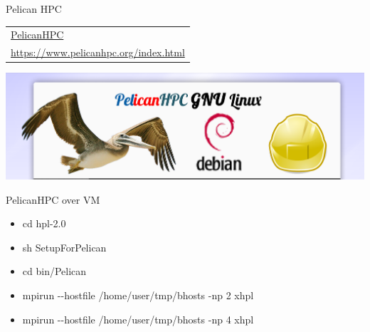 \documentclass[ignorenonframetext,]{beamer}
\providecommand{\tightlist}{%
  \setlength{\itemsep}{0pt}\setlength{\parskip}{0pt}}
\begin{document}
\begin{frame}{Pelican HPC}


\begin{longtable}[]{@{}l@{}}
\toprule
\endhead
\href{https://www.pelicanhpc.org/index.html}{PelicanHPC}\tabularnewline
\url{https://www.pelicanhpc.org/index.html}\tabularnewline
\bottomrule
\end{longtable}

\includegraphics{images/PelicanHPC.png}

\end{frame}

\begin{frame}{PelicanHPC over VM}

\begin{itemize}
\tightlist
\item
  cd hpl-2.0
\item
  sh SetupForPelican
\item
  cd bin/Pelican
\item
  mpirun -\/-hostfile /home/user/tmp/bhosts -np 2 xhpl
\item
  mpirun -\/-hostfile /home/user/tmp/bhosts -np 4 xhpl
\end{itemize}


\end{frame}
\end{document}
